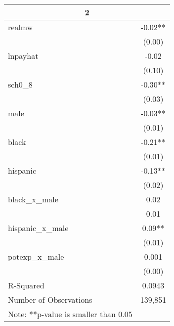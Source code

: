 \documentclass{article}
\begin{document}
\begin{table}[ht]
\centering
\caption{}
\label{my-label}
\begin{tabular}{lc}
\hline
\multicolumn{2}{c}{2}               \\
\hline
realmw                 & -0.02**  \\
                       & (0.00)  \\
lnpayhat               & -0.02 \\
                       & (0.10)  \\
sch0\_8                & -0.30** \\
                       & (0.03)  \\
male              	   &-0.03**        \\
                       & (0.01)            \\
black                  &-0.21**  \\
                       & (0.01) \\
hispanic               &-0.13**  \\
                       &(0.02) \\
black\_x\_male         &0.02  \\
                       &0.01   \\
hispanic\_x\_male      & 0.09**  \\
                       &(0.01)  \\
potexp\_x\_male       & 0.001  \\
                      & (0.00)    \\
R-Squared              & 0.0943    \\
Number of Observations         & 139,851  \\
\hline
Note: **p-value is smaller than 0.05
\end{tabular}
\end{table}
\end{document}
